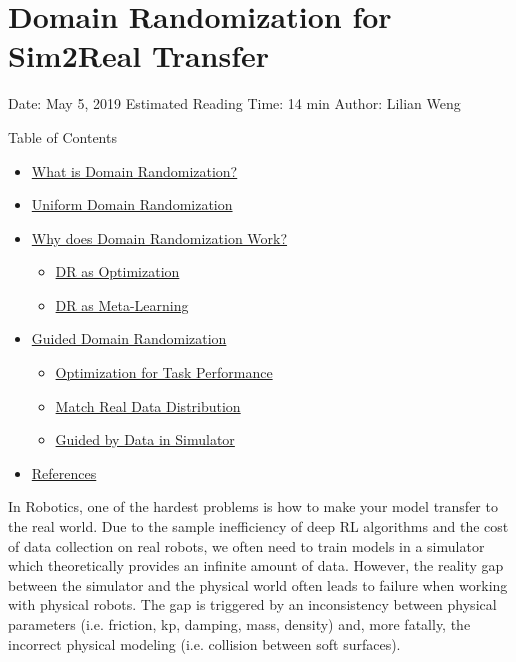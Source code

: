 \section{Domain Randomization for Sim2Real Transfer}\label{domain-randomization-for-sim2real-transfer}

Date: May 5, 2019 \textbar{} Estimated Reading Time: 14 min \textbar{} Author: Lilian Weng

{Table of Contents}

\begin{itemize}
\tightlist
\item
  \hyperref[what-is-domain-randomization]{What is Domain Randomization?}
\item
  \hyperref[uniform-domain-randomization]{Uniform Domain Randomization}
\item
  \hyperref[why-does-domain-randomization-work]{Why does Domain Randomization Work?}

  \begin{itemize}
  \tightlist
  \item
    \hyperref[dr-as-optimization]{DR as Optimization}
  \item
    \hyperref[dr-as-meta-learning]{DR as Meta-Learning}
  \end{itemize}
\item
  \hyperref[guided-domain-randomization]{Guided Domain Randomization}

  \begin{itemize}
  \tightlist
  \item
    \hyperref[optimization-for-task-performance]{Optimization for Task Performance}
  \item
    \hyperref[match-real-data-distribution]{Match Real Data Distribution}
  \item
    \hyperref[guided-by-data-in-simulator]{Guided by Data in Simulator}
  \end{itemize}
\item
  \hyperref[references]{References}
\end{itemize}

In Robotics, one of the hardest problems is how to make your model transfer to the real world. Due to the sample inefficiency of deep RL algorithms and the cost of data collection on real robots, we often need to train models in a simulator which theoretically provides an infinite amount of data. However, the reality gap between the simulator and the physical world often leads to failure when working with physical robots. The gap is triggered by an inconsistency between physical parameters (i.e. friction, kp, damping, mass, density) and, more fatally, the incorrect physical modeling (i.e. collision between soft surfaces).

